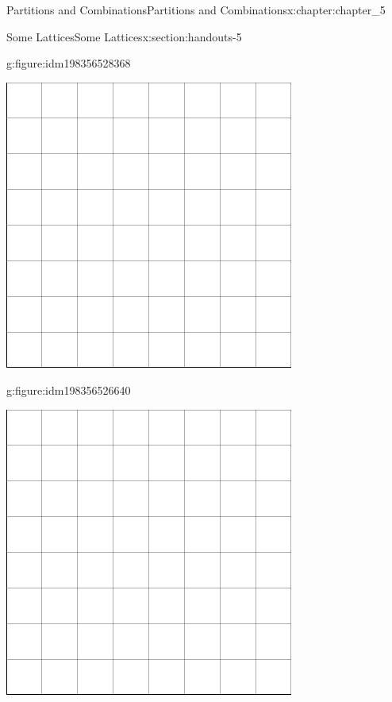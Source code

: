 \documentclass[oneside,10pt,]{book}
\numberwithin{equation}{section}
\begin{document}
\begin{chapterptx}{Partitions and Combinations}{}{Partitions and Combinations}{}{}{x:chapter:chapter_5}
\begin{sectionptx}{Some Lattices}{}{Some Lattices}{}{}{x:section:handouts-5}
\begin{figureptx}{}{g:figure:idm198356528368}{}
\begin{image}{0.125}{0.75}{0.125}
\includegraphics[width=\linewidth]{images/graphpaper8.png}
\end{image}%
\tcblower
\end{figureptx}%
\begin{figureptx}{}{g:figure:idm198356526640}{}%
\begin{image}{0.125}{0.75}{0.125}%
\includegraphics[width=\linewidth]{images/graphpaper8.png}
\end{image}%
\tcblower
\end{figureptx}%
\end{sectionptx}
\end{chapterptx}
\end{document}
